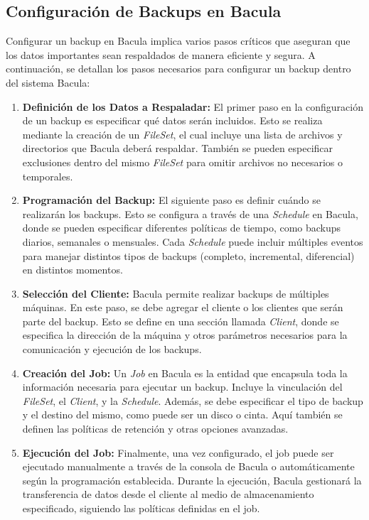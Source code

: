 \subsection{Configuración de Backups en Bacula}

Configurar un backup en Bacula implica varios pasos críticos que aseguran que los datos importantes sean respaldados de manera eficiente y segura. A continuación, se detallan los pasos necesarios para configurar un backup dentro del sistema Bacula:

\begin{enumerate}
    \item \textbf{Definición de los Datos a Respaladar:} El primer paso en la configuración de un backup es especificar qué datos serán incluidos. Esto se realiza mediante la creación de un \textit{FileSet}, el cual incluye una lista de archivos y directorios que Bacula deberá respaldar. También se pueden especificar exclusiones dentro del mismo \textit{FileSet} para omitir archivos no necesarios o temporales.
    
    \item \textbf{Programación del Backup:} El siguiente paso es definir cuándo se realizarán los backups. Esto se configura a través de una \textit{Schedule} en Bacula, donde se pueden especificar diferentes políticas de tiempo, como backups diarios, semanales o mensuales. Cada \textit{Schedule} puede incluir múltiples eventos para manejar distintos tipos de backups (completo, incremental, diferencial) en distintos momentos.
    
    \item \textbf{Selección del Cliente:} Bacula permite realizar backups de múltiples máquinas. En este paso, se debe agregar el cliente o los clientes que serán parte del backup. Esto se define en una sección llamada \textit{Client}, donde se especifica la dirección de la máquina y otros parámetros necesarios para la comunicación y ejecución de los backups.
    
    \item \textbf{Creación del Job:} Un \textit{Job} en Bacula es la entidad que encapsula toda la información necesaria para ejecutar un backup. Incluye la vinculación del \textit{FileSet}, el \textit{Client}, y la \textit{Schedule}. Además, se debe especificar el tipo de backup y el destino del mismo, como puede ser un disco o cinta. Aquí también se definen las políticas de retención y otras opciones avanzadas.
    
    \item \textbf{Ejecución del Job:} Finalmente, una vez configurado, el job puede ser ejecutado manualmente a través de la consola de Bacula o automáticamente según la programación establecida. Durante la ejecución, Bacula gestionará la transferencia de datos desde el cliente al medio de almacenamiento especificado, siguiendo las políticas definidas en el job.
\end{enumerate}

